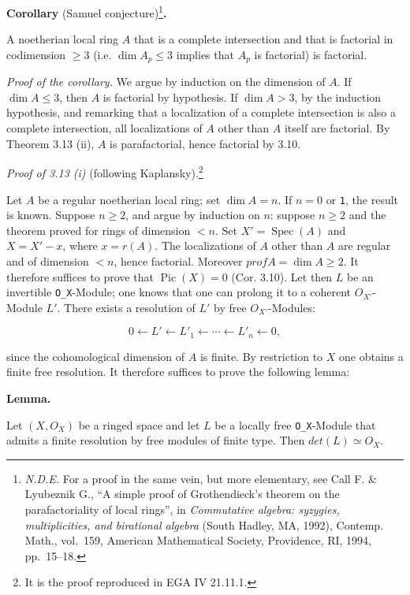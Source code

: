 \documentclass[
]{article}
\begin{document}
\textbf{Corollary} (Samuel conjecture)\footnote{\emph{N.D.E.} For a
  proof in the same vein, but more elementary, see Call F. \& Lyubeznik
  G., ``A simple proof of Grothendieck's theorem on the parafactoriality
  of local rings'', in \emph{Commutative algebra: syzygies,
  multiplicities, and birational algebra} (South Hadley, MA, 1992),
  Contemp. Math., vol.~159, American Mathematical Society, Providence,
  RI, 1994, pp.~15--18.}\textbf{.}

A noetherian local ring \(A\) that is a complete intersection and that
is factorial in codimension \(\geqslant 3\) (i.e.
\(\dim A_{p} \leqslant 3\) implies that \(A_{p}\) is factorial) is
factorial.

\emph{Proof of the corollary.} We argue by induction on the dimension of
\(A\). If \(\dim A \leqslant 3\), then \(A\) is factorial by hypothesis.
If \(\dim A > 3\), by the induction hypothesis, and remarking that a
localization of a complete intersection is also a complete intersection,
all localizations of \(A\) other than \(A\) itself are factorial. By
Theorem 3.13 (ii), \(A\) is parafactorial, hence factorial by 3.10.

\emph{Proof of 3.13 (i)} (following Kaplansky).\footnote{It is the proof
  reproduced in EGA IV 21.11.1.}

Let \(A\) be a regular noetherian local ring; set \(\dim A = n\). If
\(n = 0\) or \texttt{1}, the result is known. Suppose \(n \geqslant 2\),
and argue by induction on \(n\): suppose \(n \geqslant 2\) and the
theorem proved for rings of dimension \(< n\). Set
\(X' = \operatorname{Spec}(A)\) and \(X = X' - {x}\), where
\(x = r(A)\). The localizations of \(A\) other than \(A\) are regular
and of dimension \(< n\), hence factorial. Moreover
\(prof A = \dim A \geqslant 2\). It therefore suffices to prove that
\(\operatorname{Pic}(X) = 0\) (Cor. 3.10). Let then \(L\) be an
invertible \texttt{O\_X}-Module; one knows that one can prolong it to a
coherent \(O_{X'}\)-Module \(L'\). There exists a resolution of \(L'\)
by free \(O_{X'}\)-Modules:

\[
0 \longleftarrow L' \longleftarrow L'_{1} \longleftarrow \cdots \longleftarrow L'_{n} \longleftarrow 0,
\]

since the cohomological dimension of \(A\) is finite. By restriction to
\(X\) one obtains a finite free resolution. It therefore suffices to
prove the following lemma:

\textbf{Lemma.}

Let \((X, O_{X})\) be a ringed space and let \(L\) be a locally free
\texttt{O\_X}-Module that admits a finite resolution by free modules of
finite type. Then \(det(L) \simeq O_{X}\).
\end{document}
